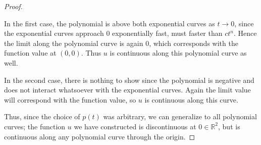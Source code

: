 \documentclass[letterpaper,11pt]{article}
\newcommand{\R}{\mathbb{R}}
\begin{document}
\begin{enumerate}
\begin{proof}
\begin{enumerate}
                    In the first case, the polynomial is above both exponential
                    curves as $t \to 0$, since the exponential curves approach
                    $0$ exponentially fast, must faster than $ct^n$. Hence the
                    limit along the polynomial curve is again $0$, which
                    corresponds with the function value at $(0, 0)$. Thus $u$
                    is continuous along this polynomial curve as well.

                    In the second case, there is nothing to show since the
                    polynomial is negative and does not interact whatsoever
                    with the exponential curves. Again the limit value will
                    correspond with the function value, so $u$ is continuous
                    along this curve.
            \end{enumerate}

            Thus, since the choice of $p(t)$ was arbitrary, we can generalize
            to all polynomial curves; the function $u$ we have constructed is
            discontinuous at $0 \in \R^2$, but is continuous along any
            polynomial curve through the origin.
        \end{proof}
\end{enumerate}
\end{document}
